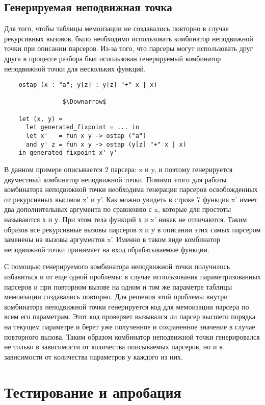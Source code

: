 \documentclass[conference]{IEEEtran}
\begin{document}
\subsection{Генерируемая неподвижная точка}

Для того, чтобы таблицы мемоизации не создавались повторно в случае рекурсивных вызовов, было необходимо использовать комбинатор неподвижной точки при описании парсеров. Из-за того, что парсеры могут использовать друг друга в процессе разбора был использован генерируемый комбинатор неподвижной точки для нескольких функций.

\begin{lstlisting}
    ostap (x : "a"; y[z] : y[z] "+" x | x)

                $\Downarrow$
         
    let (x, y) = 
      let generated_fixpoint = ... in
      let x'   = fun x y -> ostap ("a")
      and y' z = fun x y -> ostap (y[z] "+" x | x)
    in generated_fixpoint x' y' 
\end{lstlisting}

В данном примере описывается 2 парсера: x и y, и поэтому генерируется двуместный комбинатор неподвижной точки. Помимо этого для работы комбинатора неподвижной точки необходима генерация парсеров освобожденных от рекурсивных высовов x' и y'. Как можно увидеть в строке 7 функция x' имеет два дополнительных аргумента по сравнению с x, которые для простоты называются х и у. При этом тела функций х и x' никак не отличаются. Таким образов все рекурсивные вызовы парсеров x и y в описании этих самых парсером заменены на вызовы аргументов x'. Именно в таком виде комбинатор неподвижной точки принимает на вход обрабатываемые функции.

С помощью генерируемого комбинатора неподвижной точки получилось избавиться и от еще одной проблемы: в случае использования параметризованных парсеров и при повторном вызове на одном и том же параметре таблицы мемоизации создавались повторно. Для решения этой проблемы внутри комбинатора неподвижной точки генерируется код для мемоизации парсера по всем его параметрам. Этот код проверяет вызывался ли парсер высшего порядка на текущем параметре и берет уже полученное и сохраненное значение в случае повторного вызова. Таким образом комбинатор неподвижной точки генерировался не только в зависимости от количества описываемых парсеров, но и в зависимости от количества параметров у каждого из них.

\section{Тестирование и апробация}
\end{document}
